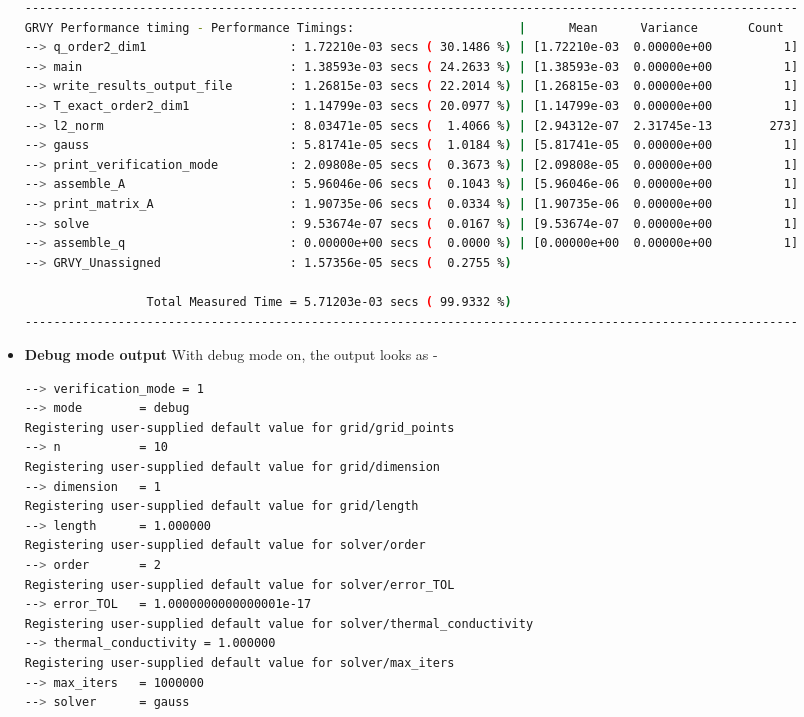\documentclass[12 pt, final]{article}
\begin{document}
\begin{itemize}
\begin{lstlisting}[language = bash, basicstyle=\tiny]
------------------------------------------------------------------------------------------------------------
GRVY Performance timing - Performance Timings:                       |      Mean      Variance       Count
--> q_order2_dim1                    : 1.72210e-03 secs ( 30.1486 %) | [1.72210e-03  0.00000e+00          1]
--> main                             : 1.38593e-03 secs ( 24.2633 %) | [1.38593e-03  0.00000e+00          1]
--> write_results_output_file        : 1.26815e-03 secs ( 22.2014 %) | [1.26815e-03  0.00000e+00          1]
--> T_exact_order2_dim1              : 1.14799e-03 secs ( 20.0977 %) | [1.14799e-03  0.00000e+00          1]
--> l2_norm                          : 8.03471e-05 secs (  1.4066 %) | [2.94312e-07  2.31745e-13        273]
--> gauss                            : 5.81741e-05 secs (  1.0184 %) | [5.81741e-05  0.00000e+00          1]
--> print_verification_mode          : 2.09808e-05 secs (  0.3673 %) | [2.09808e-05  0.00000e+00          1]
--> assemble_A                       : 5.96046e-06 secs (  0.1043 %) | [5.96046e-06  0.00000e+00          1]
--> print_matrix_A                   : 1.90735e-06 secs (  0.0334 %) | [1.90735e-06  0.00000e+00          1]
--> solve                            : 9.53674e-07 secs (  0.0167 %) | [9.53674e-07  0.00000e+00          1]
--> assemble_q                       : 0.00000e+00 secs (  0.0000 %) | [0.00000e+00  0.00000e+00          1]
--> GRVY_Unassigned                  : 1.57356e-05 secs (  0.2755 %)

                 Total Measured Time = 5.71203e-03 secs ( 99.9332 %)
------------------------------------------------------------------------------------------------------------
    \end{lstlisting}
    
\item \textbf{Debug mode output}
With debug mode on, the output looks as - 
\begin{lstlisting}[language = bash, basicstyle=\tiny]
--> verification_mode = 1
--> mode        = debug
Registering user-supplied default value for grid/grid_points
--> n           = 10
Registering user-supplied default value for grid/dimension
--> dimension   = 1
Registering user-supplied default value for grid/length
--> length      = 1.000000
Registering user-supplied default value for solver/order
--> order       = 2
Registering user-supplied default value for solver/error_TOL
--> error_TOL   = 1.0000000000000001e-17
Registering user-supplied default value for solver/thermal_conductivity
--> thermal_conductivity = 1.000000
Registering user-supplied default value for solver/max_iters
--> max_iters   = 1000000
--> solver      = gauss


\end{lstlisting}
\end{itemize}
\end{document}
